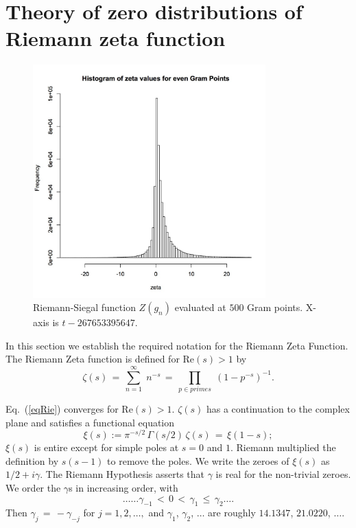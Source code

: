 \documentclass[twoside]{article}
\begin{document}
\section{\label{sec2}Theory of zero distributions of Riemann zeta function }

\begin{figure}
\centering
\includegraphics[width=0.8\textwidth]{ezeta.jpg}
\caption[]{ 
 Riemann-Siegal function $Z(g_n)$ evaluated at $500$ Gram points.
 X-axis is $t-267653395647$.}
\label{ZGram}
\end{figure}


In this section we  establish the required notation for the 
Riemann Zeta Function. 
The Riemann Zeta function is defined for $\mathrm{Re} (s) > 1$ by
\begin{equation}
\zeta ( s ) \, = \, \sum^{\infty}_{n = 1} \; n^{-s} \, = \, \prod_{p \in primes} \;
\left( 1 - p^{-s} \right)^{-1}.
\label{eqRie}
\end{equation}

Eq.~(\ref{eqRie})  converges for $\mathrm{Re} (s) > 1$.  
 $\zeta ( s )$ has a  continuation
to the complex plane and satisfies a functional equation \cite{Riemann(1858),Riemann(1892),Titchmarsh(1986),Edwards(1974)}
\begin{equation}  
\xi(s):= \pi^{-s/2} \, \Gamma (s/2) \, \zeta ( s ) \, = \, \xi ( 1 - s );
\label{eq:func}
\end{equation}
$\xi(s)$ is entire except for simple poles at $s = 0$ and $1$. Riemann
multiplied the definition by $s(s-1)$ to remove the poles. We
write the zeroes of $\xi(s)$ as $1/2 + i \gamma$. The Riemann Hypothesis  
asserts that $\gamma$ is real for the non-trivial zeroes.
We order the $\gamma$s in increasing order, with 
\begin{equation}
\ldots \ldots \gamma_{-1} \, < \, 0 \, < \, 
\gamma_1 \, \leq \, \gamma_2 \ldots. 
\end{equation}
Then $\gamma_j \, = \, - \gamma_{-j}$ for $j = 1, 2, \ldots,$ 
and    $\gamma_1$, $\gamma_2$, $\ldots$  are roughly
$14.1347$, $21.0220$, $\ldots$.
\end{document}
